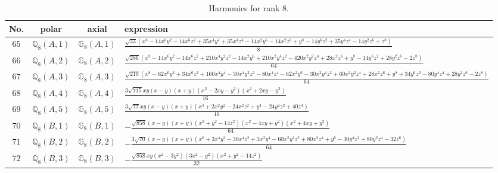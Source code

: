 \documentclass[fleqn,8pt,landscape]{jsarticle}
\begin{document}
\begin{table}[ht!]
\begin{center}
\caption{Harmonics for rank 8.}
\renewcommand{\arraystretch}{1.3}
\begin{tabular}{cccl} \hline \hline
No. & polar & axial & expression \\ \hline
$ 65 $ & $ \mathbb{Q}_{8}(A,1) $ & $ \mathbb{G}_{8}(A,1) $ & $ \frac{\sqrt{33} \left(x^{8} - 14 x^{6} y^{2} - 14 x^{6} z^{2} + 35 x^{4} y^{4} + 35 x^{4} z^{4} - 14 x^{2} y^{6} - 14 x^{2} z^{6} + y^{8} - 14 y^{6} z^{2} + 35 y^{4} z^{4} - 14 y^{2} z^{6} + z^{8}\right)}{8} $ \\
$ 66 $ & $ \mathbb{Q}_{8}(A,2) $ & $ \mathbb{G}_{8}(A,2) $ & $ \frac{\sqrt{286} \left(x^{8} - 14 x^{6} y^{2} - 14 x^{6} z^{2} + 210 x^{4} y^{2} z^{2} - 14 x^{2} y^{6} + 210 x^{2} y^{4} z^{2} - 420 x^{2} y^{2} z^{4} + 28 x^{2} z^{6} + y^{8} - 14 y^{6} z^{2} + 28 y^{2} z^{6} - 2 z^{8}\right)}{64} $ \\
$ 67 $ & $ \mathbb{Q}_{8}(A,3) $ & $ \mathbb{G}_{8}(A,3) $ & $ \frac{\sqrt{210} \left(x^{8} - 62 x^{6} y^{2} + 34 x^{6} z^{2} + 160 x^{4} y^{4} - 30 x^{4} y^{2} z^{2} - 80 x^{4} z^{4} - 62 x^{2} y^{6} - 30 x^{2} y^{4} z^{2} + 60 x^{2} y^{2} z^{4} + 28 x^{2} z^{6} + y^{8} + 34 y^{6} z^{2} - 80 y^{4} z^{4} + 28 y^{2} z^{6} - 2 z^{8}\right)}{64} $ \\
$ 68 $ & $ \mathbb{Q}_{8}(A,4) $ & $ \mathbb{G}_{8}(A,4) $ & $ \frac{3 \sqrt{715} x y \left(x - y\right) \left(x + y\right) \left(x^{2} - 2 x y - y^{2}\right) \left(x^{2} + 2 x y - y^{2}\right)}{16} $ \\
$ 69 $ & $ \mathbb{Q}_{8}(A,5) $ & $ \mathbb{G}_{8}(A,5) $ & $ \frac{3 \sqrt{77} x y \left(x - y\right) \left(x + y\right) \left(x^{4} + 2 x^{2} y^{2} - 24 x^{2} z^{2} + y^{4} - 24 y^{2} z^{2} + 40 z^{4}\right)}{16} $ \\
$ 70 $ & $ \mathbb{Q}_{8}(B,1) $ & $ \mathbb{G}_{8}(B,1) $ & $ - \frac{\sqrt{858} \left(x - y\right) \left(x + y\right) \left(x^{2} + y^{2} - 14 z^{2}\right) \left(x^{2} - 4 x y + y^{2}\right) \left(x^{2} + 4 x y + y^{2}\right)}{64} $ \\
$ 71 $ & $ \mathbb{Q}_{8}(B,2) $ & $ \mathbb{G}_{8}(B,2) $ & $ - \frac{3 \sqrt{70} \left(x - y\right) \left(x + y\right) \left(x^{6} + 3 x^{4} y^{2} - 30 x^{4} z^{2} + 3 x^{2} y^{4} - 60 x^{2} y^{2} z^{2} + 80 x^{2} z^{4} + y^{6} - 30 y^{4} z^{2} + 80 y^{2} z^{4} - 32 z^{6}\right)}{64} $ \\
$ 72 $ & $ \mathbb{Q}_{8}(B,3) $ & $ \mathbb{G}_{8}(B,3) $ & $ - \frac{\sqrt{858} x y \left(x^{2} - 3 y^{2}\right) \left(3 x^{2} - y^{2}\right) \left(x^{2} + y^{2} - 14 z^{2}\right)}{32} $ \\

\end{tabular}
\end{center}
\end{table}
\end{document}
